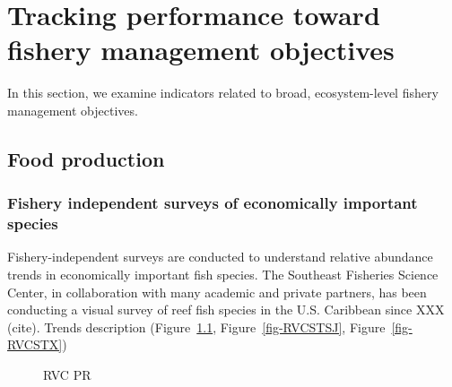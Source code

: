 \documentclass[
  letterpaper,
  oneside,
  open=any]{scrbook}
\begin{document}

\chapter{Tracking performance toward fishery management
objectives}\label{tracking-performance-toward-fishery-management-objectives}

In this section, we examine indicators related to broad, ecosystem-level
fishery management objectives.

\section{Food production}\label{food-production}

\subsection{Fishery independent surveys of economically important
species}\label{fishery-independent-surveys-of-economically-important-species}

Fishery-independent surveys are conducted to understand relative
abundance trends in economically important fish species. The Southeast
Fisheries Science Center, in collaboration with many academic and
private partners, has been conducting a visual survey of reef fish
species in the U.S. Caribbean since XXX (cite). Trends description
(Figure~\ref{fig-RVCPR}, Figure~\ref{fig-RVCSTSJ},
Figure~\ref{fig-RVCSTX})

\begin{figure}


\caption{\label{fig-RVCPR}RVC PR}

\end{figure}%
\end{document}
